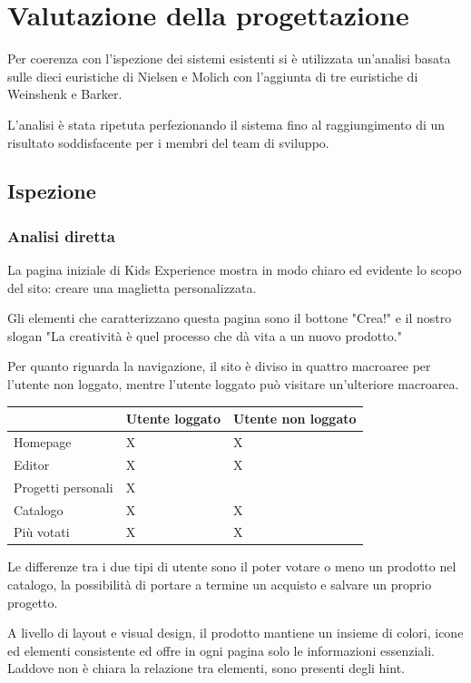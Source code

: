\documentclass[12pt,italian,]{report}
\begin{document}
\hypertarget{valutazione-della-progettazione}{%
\chapter{Valutazione della
progettazione}\label{valutazione-della-progettazione}}

Per coerenza con l'ispezione dei sistemi esistenti si è utilizzata un'analisi basata sulle dieci euristiche di Nielsen e Molich con l'aggiunta di tre euristiche di Weinshenk e Barker.

L'analisi è stata ripetuta perfezionando il sistema fino al raggiungimento di un risultato soddisfacente per i membri del team di sviluppo.

\section{Ispezione}\label{ispezione}

\subsection{Analisi diretta}

La pagina iniziale di Kids Experience mostra in modo chiaro ed evidente lo scopo del sito: creare una maglietta personalizzata. 

Gli elementi che caratterizzano questa pagina sono il bottone "Crea!" e il nostro slogan "La creatività è quel processo che dà vita a un nuovo prodotto."

Per quanto riguarda la navigazione, il sito è diviso in quattro macroaree per l'utente non loggato, mentre l'utente loggato può visitare un'ulteriore macroarea. 

\begin{longtable}[]{@{}lll@{}}
\toprule
& Utente loggato & Utente non loggato\tabularnewline
\midrule
\endhead
Homepage & X & X\tabularnewline
Editor & X & X\tabularnewline
Progetti personali & X &\tabularnewline
Catalogo & X & X\tabularnewline
Più votati & X & X\tabularnewline
\bottomrule
\end{longtable}

Le differenze tra i due tipi di utente sono il poter votare o meno un prodotto nel catalogo, la possibilità di portare a termine un acquisto e salvare un proprio progetto.

A livello di layout e visual design, il prodotto mantiene un insieme di colori, icone ed elementi consistente ed offre in ogni pagina solo le informazioni essenziali. Laddove non è chiara la relazione tra elementi, sono presenti degli hint.
\end{document}
